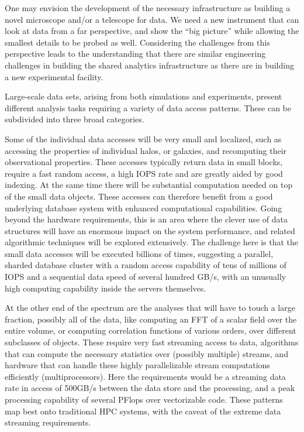 \medskip


\medskip

One may envision the development of the necessary infrastructure as
building a novel microscope and/or a telescope for data. We need a new
instrument that can look at data from a far perspective, and show the
``big picture'' while allowing the smallest details to be probed as
well. Considering the challenges from this perspective leads to the
understanding that there are similar engineering challenges in
building the shared analytics infrastructure as there are in building
a new experimental facility.

Large-scale data sets, arising from both simulations and experiments,
present different analysis tasks requiring a variety of data access
patterns. These can be subdivided into three broad categories.

Some of the individual data accesses will be very small and localized,
such as accessing the properties of individual halos, or galaxies, and
recomputing their observational properties. These accesses typically
return data in small blocks, require a fast random access, a high IOPS
rate and are greatly aided by good indexing. At the same time there
will be substantial computation needed on top of the small data
objects. These accesses can therefore benefit from a good underlying
database system with enhanced computational capabilities. Going beyond
the hardware requirements, this is an area where the clever use of
data structures will have an enormous impact on the system
performance, and related algorithmic techniques will be explored
extensively. The challenge here is that the small data accesses will
be executed billions of times, suggesting a parallel, sharded database
cluster with a random access capability of tens of millions of IOPS
and a sequential data speed of several hundred GB/s, with an unusually
high computing capability inside the servers themselves.

At the other end of the spectrum are the analyses that will have to
touch a large fraction, possibly all of the data, like computing an
FFT of a scalar field over the entire volume, or computing correlation
functions of various orders, over different subclasses of
objects. These require very fast streaming access to data, algorithms
that can compute the necessary statistics over (possibly multiple)
streams, and hardware that can handle these highly parallelizable
stream computations efficiently (multiprocessors). Here the
requirements would be a streaming data rate in access of 500GB/s
between the data store and the processing, and a peak processing
capability of several PFlops over vectorizable code. These patterns
map best onto traditional HPC systems, with the caveat of the extreme
data streaming requirements.

